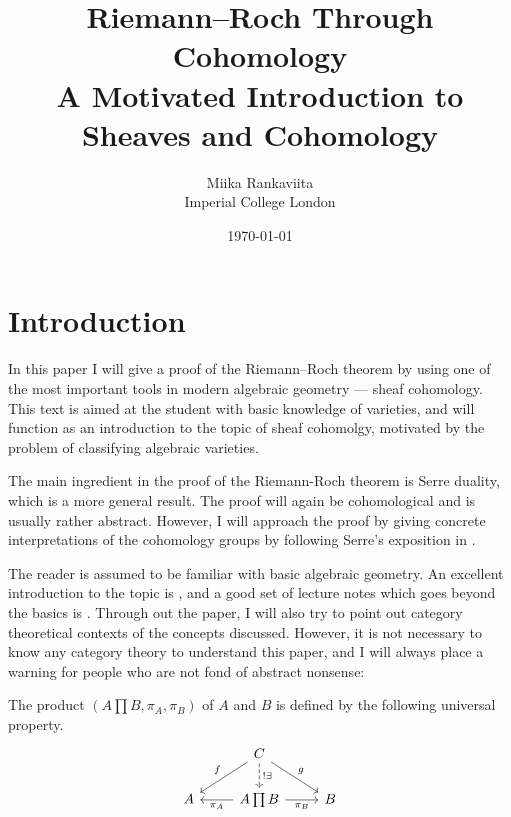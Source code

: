 \documentclass[12pt]{article}
\begin{document}
\title{Riemann--Roch Through Cohomology\\
        \large A Motivated Introduction to Sheaves and Cohomology}
\author{Miika Rankaviita\\Imperial College London}
\date{\today}
\maketitle


\section{Introduction}
In this paper I will give a proof of the Riemann--Roch theorem
by using one of the most important tools in modern algebraic geometry ---
sheaf cohomology. This text is aimed at the student with
basic knowledge of varieties, and will function as an introduction
to the topic of sheaf cohomolgy, motivated by the problem of classifying
algebraic varieties.


The main ingredient in the proof of the Riemann-Roch theorem is
Serre duality, which is a more general result. The proof will again
be cohomological and is usually rather abstract. However, I will
approach the proof by giving concrete interpretations of
the cohomology groups by following Serre's exposition in \cite{serre}.

The reader is assumed to be familiar with basic algebraic geometry.
An excellent introduction to the topic is \cite{reid}, and a good set
of lecture notes which goes beyond the basics is \cite{gathmann}.
Through out the paper, I will also try to point out category theoretical
contexts of the concepts discussed. However, it is not necessary to know
any category theory to understand this paper, and I will always place a
warning for people who are not fond of abstract nonsense:

\begin{cat}
  The product $(A\prod B, \pi_{A}, \pi_{B})$ of $A$ and $B$ is defined by the
  following universal property.
  \[
    \begin{tikzcd}
      &C\arrow{ld}[swap]{f}\arrow[dashed]{d}{!\exists}\arrow{rd}{g}&\\
      A&A\prod B\arrow{l}{\pi_{A}}\arrow{r}[swap]{\pi_{B}}&B
    \end{tikzcd}
  \]
\end{cat}
\end{document}
